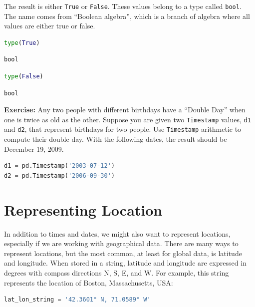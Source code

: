 The result is either \passthrough{\lstinline!True!} or
\passthrough{\lstinline!False!}. These values belong to a type called
\passthrough{\lstinline!bool!}. The name comes from ``Boolean algebra'',
which is a branch of algebra where all values are either true or false.

\begin{lstlisting}[language=Python,style=source]
type(True)
\end{lstlisting}

\begin{lstlisting}[style=output]
bool
\end{lstlisting}

\begin{lstlisting}[language=Python,style=source]
type(False)
\end{lstlisting}

\begin{lstlisting}[style=output]
bool
\end{lstlisting}

\textbf{Exercise:} Any two people with different birthdays have a
``Double Day'' when one is twice as old as the other. Suppose you are
given two \passthrough{\lstinline!Timestamp!} values,
\passthrough{\lstinline!d1!} and \passthrough{\lstinline!d2!}, that
represent birthdays for two people. Use
\passthrough{\lstinline!Timestamp!} arithmetic to compute their double
day. With the following dates, the result should be December 19, 2009.

\begin{lstlisting}[language=Python,style=source]
d1 = pd.Timestamp('2003-07-12')
d2 = pd.Timestamp('2006-09-30')
\end{lstlisting}

\hypertarget{representing-location}{%
\section{Representing Location}\label{representing-location}}

In addition to times and dates, we might also want to represent
locations, especially if we are working with geographical data. There
are many ways to represent locations, but the most common, at least for
global data, is latitude and longitude. When stored in a string,
latitude and longitude are expressed in degrees with compass directions
N, S, E, and W. For example, this string represents the location of
Boston, Massachusetts, USA:

\begin{lstlisting}[language=Python,style=source]
lat_lon_string = '42.3601° N, 71.0589° W'
\end{lstlisting}

